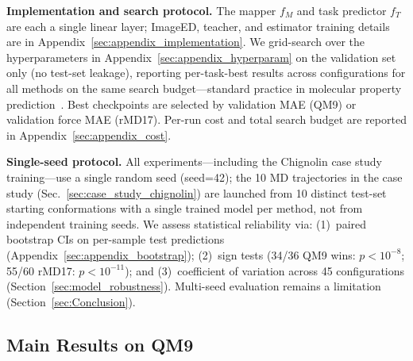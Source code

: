 \textbf{Implementation and search protocol.} The mapper $f_M$ and task predictor $f_T$ are each a single linear layer; ImageED, teacher, and estimator training details are in Appendix~\ref{sec:appendix_implementation}. We grid-search over the hyperparameters in Appendix~\ref{sec:appendix_hyperparam} on the validation set only (no test-set leakage), reporting per-task-best results across configurations for all methods on the same search budget---standard practice in molecular property prediction~\cite{liu2022spherical,wang2024enhancing}. Best checkpoints are selected by validation MAE (QM9) or validation force MAE (rMD17). Per-run cost and total search budget are reported in Appendix~\ref{sec:appendix_cost}.

\textbf{Single-seed protocol.} All experiments---including the Chignolin case study training---use a single random seed (seed=42); the 10 MD trajectories in the case study (Sec.~\ref{sec:case_study_chignolin}) are launched from 10 distinct test-set starting conformations with a single trained model per method, not from independent training seeds. We assess statistical reliability via: (1)~paired bootstrap CIs on per-sample test predictions (Appendix~\ref{sec:appendix_bootstrap}); (2)~sign tests (34/36 QM9 wins: $p < 10^{-8}$; 55/60 rMD17: $p < 10^{-11}$); and (3)~coefficient of variation across 45 configurations (Section~\ref{sec:model_robustness}). Multi-seed evaluation remains a limitation (Section~\ref{sec:Conclusion}).

\subsection{Main Results on QM9}

